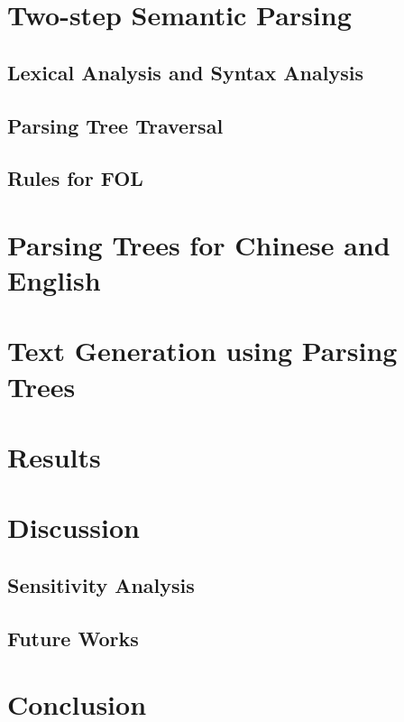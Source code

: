\documentclass{article}
\begin{document}
\section{Two-step Semantic Parsing}{
	\subsection{Lexical Analysis and Syntax Analysis}{}

	\subsection{Parsing Tree Traversal}{}

	\subsection{Rules for FOL}{}
}

\section{Parsing Trees for Chinese and English}{}

\section{Text Generation using Parsing Trees}{}

\section{Results}{}

\section{Discussion}{
	\subsection{Sensitivity Analysis}{}

	\subsection{Future Works}{}
}

\section{Conclusion}{}



\citation
\end{document}

